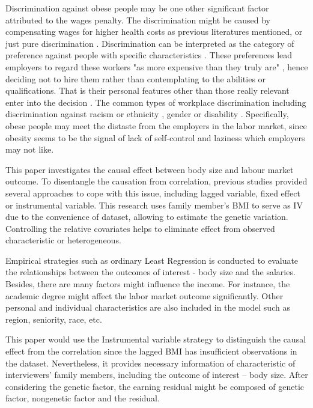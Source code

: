 \documentclass{article}
\begin{document}
\setlength{\parindent}{2em}
Discrimination against obese people may be one other significant factor attributed to the wages penalty. The discrimination might be caused by compensating wages for higher health costs as previous literatures \citep{baum2004wage} mentioned, or just pure discrimination \citep{han2011direct}. Discrimination can be interpreted as the category of preference against people with specific characteristics \citep{becker1971sociological}. These preferences lead employers to regard these workers "as more expensive than they truly are" \citep{charles2008prejudice}, hence deciding not to hire them rather than contemplating to the abilities or qualifications. That is their personal features other than those really relevant enter into the decision \citep{arrow1973theory}. The common types of workplace discrimination including discrimination against racism or ethnicity \citep{deitch2003subtle,elliott2004race,fox2005racial}, gender \citep{badgett1995wage,weichselbaumer2003sexual,badgett2009gay} or disability \citep{chan2005drivers}. Specifically, obese people may meet the distaste from the employers in the labor market, since obesity seems to be the signal of lack of self-control and laziness \citep{sobal1989socioeconomic,puhl2007stigma} which employers may not like.
\par
\setlength{\parindent}{2em}
This paper investigates the causal effect between body size and labour market outcome. To disentangle the causation from correlation, previous studies provided several approaches to cope with this issue, including lagged variable, fixed effect or instrumental variable. This research uses family member’s BMI to serve as IV due to the convenience of dataset, allowing to estimate the genetic variation. Controlling the relative covariates helps to eliminate effect from observed characteristic or heterogeneous. 
\par
\setlength{\parindent}{2em}
Empirical strategies such as ordinary Least Regression is conducted to evaluate the relationships between the outcomes of interest - body size and the salaries. Besides, there are many factors might influence the income. For instance, the academic degree might affect the labor market outcome significantly. Other personal and individual characteristics are also included in the model such as region, seniority, race, etc.
\par
\setlength{\parindent}{2em}
This paper would use the Instrumental variable strategy to distinguish the causal effect from the correlation since the lagged BMI has insufficient observations in the dataset. Nevertheless, it provides necessary information of characteristic of interviewers’ family members, including the outcome of interest – body size. After considering the genetic factor, the earning residual might be composed of genetic factor, nongenetic factor and the residual.
\end{document}
